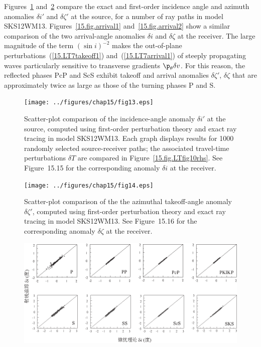 {Figures~\ref{15.fig.takeoff1} and~\ref{15.fig.takeoff2}
compare the exact and first-order incidence angle and
azimuth anomalies $\delta i'$ and $\delta\zeta'$ at the
source, for a number of ray paths in model SKS12WM13.
Figures~\ref{15.fig.arrival1} and~\ref{15.fig.arrival2}
show a similar comparison of the two arrival-angle
anomalies $\delta i$ and $\delta\zeta$ at the receiver.
The large magnitude of the term $(\sin i)^{-2}$ makes
the out-of-plane perturbations~(\ref{15.LT7takeoff1})
and~(\ref{15.LT7arrival1}) of steeply propagating
waves particularly sensitive to transverse gradients
$\p_{\theta}\delta v$.  For this reason, the reflected
phases PcP and ScS exhibit takeoff and arrival anomalies
$\delta\zeta'$, $\delta\zeta$ that are approximately twice
as large as those of the turning phases P and S.
\begin{figure}
\begin{center}
\texttt{[image: ../figures/chap15/fig13.eps]}
\end{center}
\caption[takeoff angle 1]
{\label{15.fig.takeoff1}
Scatter-plot comparison of the incidence-angle anomaly
$\delta i'$ at the source, computed using first-order
perturbation theory and exact ray tracing in model SKS12WM13.
Each graph displays results for 1000 randomly selected
source-receiver paths; the associated travel-time perturbations
$\delta T$ are compared in Figure~\ref{15.fig.LTfig10rhs}.
See Figure~15.15 for the corresponding anomaly $\delta i$ at the receiver.
}
\end{figure}
\begin{figure}
\begin{center}
\texttt{[image: ../figures/chap15/fig14.eps]}
\end{center}
\caption[takeoff angle 2]
{\label{15.fig.takeoff2}
Scatter-plot comparison of the the azimuthal takeoff-angle
anomaly $\delta\zeta'$, computed using first-order
perturbation theory and exact ray tracing in model SKS12WM13.
See Figure~15.16 for the corresponding anomaly $\delta\zeta$ at the receiver.
}
\end{figure}
\begin{figure}
\begin{center}
\includegraphics{../figures/chap15/fig15.eps}

\end{center}
\end{figure}}
